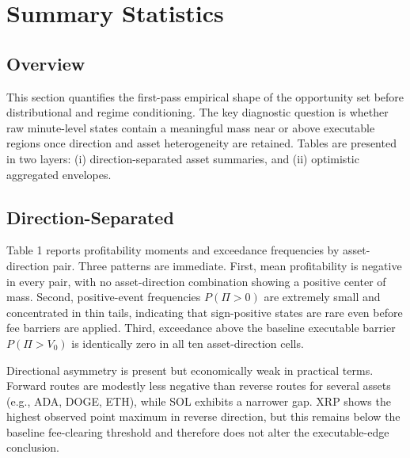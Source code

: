 \documentclass[11pt,a4paper]{article}
\begin{document}
\section{Summary Statistics}
\subsection{Overview}
This section quantifies the first-pass empirical shape of the opportunity set before distributional and regime conditioning. The key diagnostic question is whether raw minute-level states contain a meaningful mass near or above executable regions once direction and asset heterogeneity are retained. Tables are presented in two layers: (i) direction-separated asset summaries, and (ii) optimistic aggregated envelopes.

\subsection{Direction-Separated}
\noindent Table 1 reports profitability moments and exceedance frequencies by asset-direction pair. Three patterns are immediate. First, mean profitability is negative in every pair, with no asset-direction combination showing a positive center of mass. Second, positive-event frequencies $P(\Pi>0)$ are extremely small and concentrated in thin tails, indicating that sign-positive states are rare even before fee barriers are applied. Third, exceedance above the baseline executable barrier $P(\Pi>V_0)$ is identically zero in all ten asset-direction cells.

\noindent Directional asymmetry is present but economically weak in practical terms. Forward routes are modestly less negative than reverse routes for several assets (e.g., ADA, DOGE, ETH), while SOL exhibits a narrower gap. XRP shows the highest observed point maximum in reverse direction, but this remains below the baseline fee-clearing threshold and therefore does not alter the executable-edge conclusion.
\end{document}
